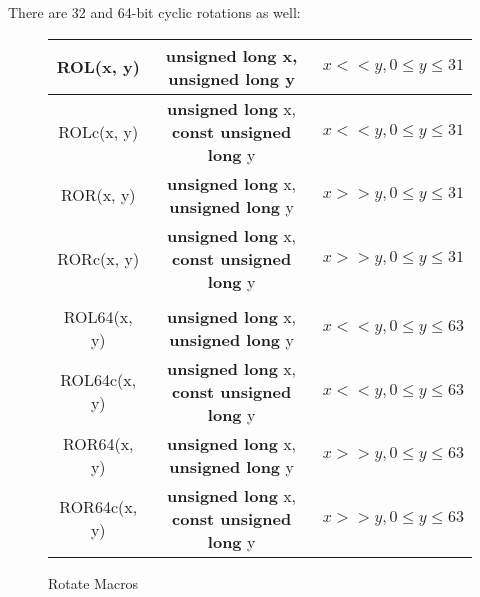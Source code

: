 \documentclass[synpaper]{book}
\begin{document}
There are 32 and 64-bit cyclic rotations as well:
        
\begin{figure}[hpbt]
\begin{small}
\begin{center}
\begin{tabular}{|c|c|c|}
     \hline ROL(x, y) & {\bf unsigned long} x, {\bf unsigned long} y & $x << y, 0 \le y \le 31$ \\
     \hline ROLc(x, y) & {\bf unsigned long} x, {\bf const unsigned long} y & $x << y, 0 \le y \le 31$ \\
     \hline ROR(x, y) & {\bf unsigned long} x, {\bf unsigned long} y & $x >> y, 0 \le y \le 31$ \\
     \hline RORc(x, y) & {\bf unsigned long} x, {\bf const unsigned long} y & $x >> y, 0 \le y \le 31$ \\
     \hline && \\
     \hline ROL64(x, y) & {\bf unsigned long} x, {\bf unsigned long} y & $x << y, 0 \le y \le 63$ \\
     \hline ROL64c(x, y) & {\bf unsigned long} x, {\bf const unsigned long} y & $x << y, 0 \le y \le 63$ \\
     \hline ROR64(x, y) & {\bf unsigned long} x, {\bf unsigned long} y & $x >> y, 0 \le y \le 63$ \\
     \hline ROR64c(x, y) & {\bf unsigned long} x, {\bf const unsigned long} y & $x >> y, 0 \le y \le 63$ \\
     \hline
\end{tabular}
\caption{Rotate Macros}
\end{center}
\end{small}
\end{figure}
\end{document}
